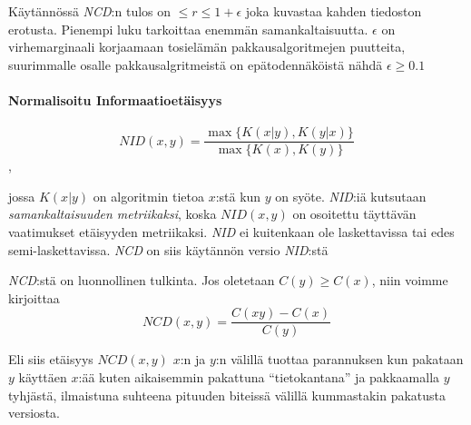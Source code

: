 \documentclass[11pt,finnish]{tktltiki2}
\theoremstyle{definition}
\theoremstyle{remark}
\begin{document}
    Käytännössä \emph{NCD}:n tulos on $ \leq r \leq 1+ \epsilon$ joka kuvastaa kahden tiedoston erotusta. Pienempi luku tarkoittaa enemmän samankaltaisuutta. $\epsilon$ on virhemarginaali korjaamaan tosielämän pakkausalgoritmejen puutteita, suurimmalle osalle pakkausalgritmeistä on epätodennäköistä nähdä $\epsilon \geq 0.1$

  \paragraph{Normalisoitu Informaatioetäisyys} %
  \label{par:normalisoitu_informaatioet_isyys}
    $$ NID(x,y) = \frac{ \max\{K{(x|y)},K{(y|x)}\} }{ \max \{K(x),K(y)\}} $$,

    jossa $K(x|y)$ on algoritmin tietoa $x$:stä kun $y$ on syöte. \emph{NID}:iä kutsutaan \emph{samankaltaisuuden metriikaksi}, koska $NID(x,y)$ on osoitettu täyttävän vaatimukset etäisyyden metriikaksi. \emph{NID} ei kuitenkaan ole laskettavissa tai edes semi-laskettavissa. \emph{NCD} on siis käytännön versio \emph{NID}:stä

  \emph{NCD}:stä on luonnollinen tulkinta. Jos oletetaan $C(y) \geq C(x)$, niin voimme kirjoittaa
  $$ NCD(x,y) = \frac{C(xy)-C(x)}{C(y)} $$

  Eli siis etäisyys $NCD(x,y)$ $x$:n ja $y$:n välillä tuottaa parannuksen kun pakataan $y$ käyttäen $x$:ää kuten aikaisemmin pakattuna ``tietokantana'' ja pakkaamalla $y$ tyhjästä, ilmaistuna suhteena pituuden biteissä välillä kummastakin pakatusta versiosta.

%
%

%

% 





%
\end{document}
